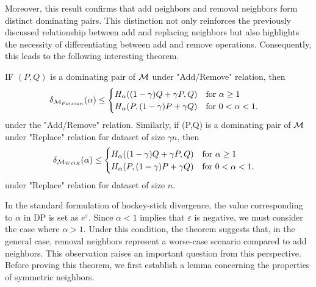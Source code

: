 \documentclass{article}
\begin{document}
Moreover, this result confirms that add neighbors and removal neighbors form distinct dominating pairs. This distinction not only reinforces the previously discussed relationship between add and replacing neighbors but also highlights the necessity of differentiating between add and remove operations. Consequently, this leads to the following interesting theorem.

\begin{theorem}\label{maintheorem}
    IF $(P,Q)$ is a dominating pair of ${\mathcal{M}}$ under "Add/Remove" relation, then
    \begin{equation*}
        \delta_{{\mathcal{M}}_{Poisson}}(\alpha) \le \begin{cases}
            H_\alpha((1-\gamma)Q+\gamma P, Q) \quad \text{for } \alpha \ge 1\\
            H_\alpha(P, (1-\gamma)P+\gamma Q) \quad \text{for } 0 < \alpha < 1.
        \end{cases}
    \end{equation*}
    under the "Add/Remove" relation. Similarly, if (P,Q) is a dominating pair of ${\mathcal{M}}$ under "Replace" relation for dataset of size $\gamma n$, then
    \begin{equation*}
        \delta_{{\mathcal{M}}_{WOR}}(\alpha) \le \begin{cases}
            H_\alpha((1-\gamma)Q+\gamma P, Q) \quad \text{for } \alpha \ge 1\\
            H_\alpha(P, (1-\gamma)P+\gamma Q) \quad \text{for } 0 < \alpha < 1.
        \end{cases}
    \end{equation*}
    under "Replace" relation for dataset of size $n$.
\end{theorem}

In the standard formulation of hockey-stick divergence, the value corresponding to $\alpha$ in DP is set as $e^\varepsilon$. Since $\alpha < 1$ implies that $\varepsilon$ is negative, we must consider the case where $\alpha > 1$. Under this condition, the theorem suggests that, in the general case, removal neighbors represent a worse-case scenario compared to add neighbors. This observation raises an important question from this perspective. Before proving this theorem, we first establish a lemma concerning the properties of symmetric neighbors.
\end{document}
